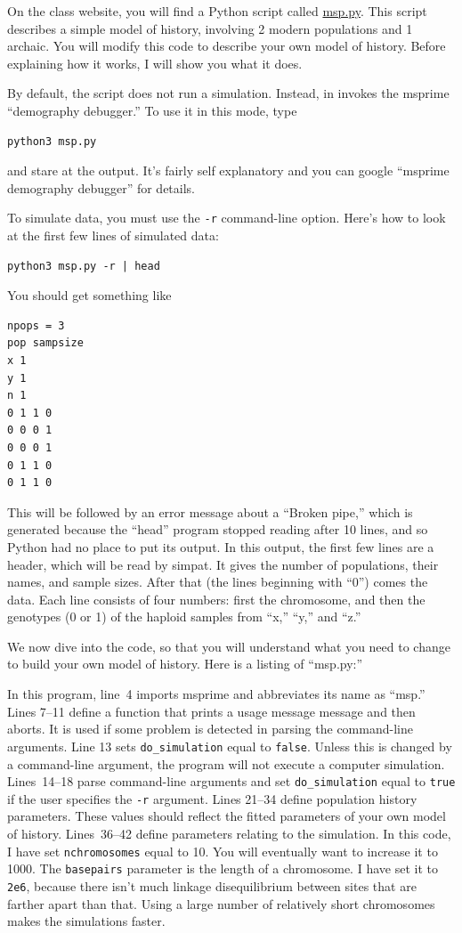 \documentclass[11pt]{article}
\begin{document}
On the class website, you will find a Python script called
\href{./msp.py}{msp.py}. This script describes a simple model of
history, involving 2 modern populations and 1 archaic. You will modify
this code to describe your own model of history. Before explaining how
it works, I will show you what it does.

By default, the script does not run a simulation. Instead, in invokes
the msprime ``demography debugger.'' To use it in this mode, type
\begin{verbatim}
python3 msp.py
\end{verbatim}
and stare at the output. It's fairly self explanatory and you can
google ``msprime demography debugger'' for details.

To simulate data, you must use the \texttt{-r} command-line
option. Here's how to look at the first few lines of simulated data:
\begin{verbatim}
python3 msp.py -r | head
\end{verbatim}
You should get something like
\begin{verbatim}
npops = 3
pop sampsize
x 1
y 1
n 1
0 1 1 0 
0 0 0 1 
0 0 0 1 
0 1 1 0 
0 1 1 0 
\end{verbatim}
This will be followed by an error message about a ``Broken pipe,''
which is generated because the ``head'' program stopped reading after
10 lines, and so Python had no place to put its output. In this
output, the first few lines are a header, which will be read by
simpat. It gives the number of populations, their names, and sample
sizes. After that (the lines beginning with ``0'') comes the
data. Each line consists of four numbers: first the chromosome, and
then the genotypes (0 or 1) of the haploid samples from ``x,'' ``y,''
and ``z.''

We now dive into the code, so that you will understand what you need
to change to build your own model of history. Here is a listing of
``msp.py:''


In this program, line~4 imports msprime and abbreviates its name as
``msp.'' Lines 7--11 define a function that prints a usage message
message and then aborts. It is used if some problem is detected in
parsing the command-line arguments. Line 13 sets \verb|do_simulation|
equal to \texttt{false}. Unless this is changed by a command-line
argument, the program will not execute a computer
simulation. Lines~14--18 parse command-line arguments and set
\verb|do_simulation| equal to \texttt{true} if the user specifies the
\texttt{-r} argument.  Lines 21--34 define population history
parameters. These values should reflect the fitted parameters of your
own model of history. Lines~36--42 define parameters relating to the
simulation. In this code, I have set \texttt{nchromosomes} equal to
10. You will eventually want to increase it to 1000. The
\texttt{basepairs} parameter is the length of a chromosome. I have set
it to \texttt{2e6}, because there isn't much linkage disequilibrium
between sites that are farther apart than that. Using a large number
of relatively short chromosomes makes the simulations faster.
\end{document}
